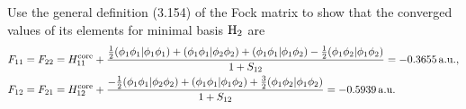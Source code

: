\documentclass[a4paper]{book}
\newcounter{exercise}[chapter]
\newcommand{\core}{{\rm core}}
\newcommand{\au}{{\rm a.u.}}
\begin{document}
	\begin{exercise}
	Use the general definition (3.154) of the Fock matrix to show that the converged values of its elements for minimal basis $\ce{H2}$ are
	\begin{align*}
		F_{11} &= F_{22} = H^\core_{11} + \frac{ \frac{1}{2} ( \phi_1 \phi_1 | \phi_1 \phi_1 ) + ( \phi_1 \phi_1 | \phi_2 \phi_2 ) + ( \phi_1 \phi_1 | \phi_1 \phi_2 ) - \frac{1}{2} ( \phi_1 \phi_2 | \phi_1 \phi_2 ) }{ 1+S_{12} }  = -0.3655 \, \au , \\
		F_{12} &= F_{21} = H^\core_{12} + \frac{ -\frac{1}{2} ( \phi_1 \phi_1 | \phi_2 \phi_2 ) + ( \phi_1 \phi_1 | \phi_1 \phi_2 ) + \frac{3}{2} ( \phi_1 \phi_2 | \phi_1 \phi_2 ) }{ 1+S_{12} }  = -0.5939 \, \au
	\end{align*}
	\end{exercise}
	
\end{document}
